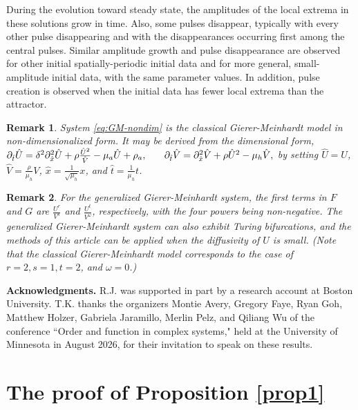 \documentclass[11pt]{article}
\numberwithin{equation}{section}
\newtheorem{remark}{Remark}[section]
\begin{document}
During the evolution toward steady state, the amplitudes of the local extrema in these solutions grow in time.
Also, some pulses disappear, typically with every other pulse disappearing and with the disappearances occurring first among the central pulses.
Similar amplitude growth and pulse disappearance are observed for other initial spatially-periodic initial data and for more general, small-amplitude initial data, with the same parameter values.
In addition, pulse creation is observed when the initial data has fewer local extrema than the attractor.


\begin{remark}
System \eqref{eq:GM-nondim}
is the classical Gierer-Meinhardt model in non-dimensionalized form. 
It may be derived from the dimensional form,
$
        \partial_{\hat{t}} \hat{U} = \delta^2 \partial_{\hat{x}}^2 \hat{U} + \rho \frac{\hat{U}^2}{\hat{V}} - \mu_a \hat{U} + \rho_a,  \hskip0.25truein 
        \partial_{\hat{t}} \hat{V} = \partial_{\hat{x}}^2 \hat{V} + \rho \hat{U}^2 - \mu_h \hat{V},
$
by setting 
$\hat{U}=U$,
$\hat{V}=\frac{\rho}{\mu_h} V$,
$\hat{x}=\frac{1}{\sqrt{\mu_h}}x$, and 
$\hat{t}=\frac{1}{\mu_h} t$.
\end{remark}

\begin{remark}
For the generalized Gierer-Meinhardt system, the first terms in $F$ and $G$ are $\frac{U^r}{V^s}$ and $\frac{U^t}{V^\omega}$, respectively, with the four powers being non-negative.
The generalized Gierer-Meinhardt system can also exhibit Turing bifurcations, and the methods of this article can be applied when the diffusivity of $U$ is small.
(Note that the classical Gierer-Meinhardt model corresponds to the case of $r=2, s=1, t=2$, and $\omega=0$.)
\end{remark} 

\noindent
{\bf Acknowledgments.}
R.J. was supported in part by a research account at Boston University.
T.K. thanks the organizers Montie Avery, Gregory Faye, Ryan Goh, Matthew Holzer, Gabriela Jaramillo, Merlin Pelz, and Qiliang Wu of the conference ``Order and function in complex systems," held at the University of Minnesota in August 2026, for their invitation to speak on these results.


\appendix

\section{The proof of Proposition \texorpdfstring{\ref{prop1}}{Lg}}\label{app:prop1} 
\end{document}
